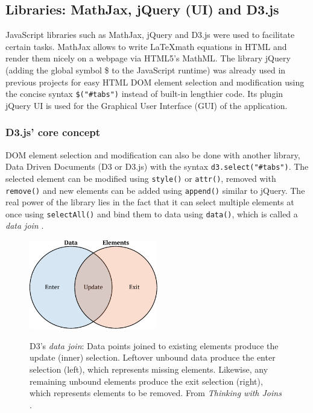 \subsection{Libraries: MathJax, jQuery (UI) and D3.js}\label{sec:libraries}
JavaScript libraries such as MathJax, jQuery and D3.js were used to facilitate certain tasks. MathJax allows to write \LaTeX math equations in HTML and render them nicely on a webpage via HTML5's MathML. The library jQuery (adding the global symbol \$ to the JavaScript runtime) was already used in previous projects for easy HTML DOM element selection and modification using the concise syntax \texttt{\$("\#tabs")} instead of built-in lengthier code. Its plugin jQuery UI is used for the Graphical User Interface (GUI) of the application.

\subsubsection{D3.js' core concept}\label{sec:dthree}
DOM element selection and modification can also be done with another library, Data Driven Documents (D3 or D3.js) \cite{bostock2011d3} with the syntax \texttt{d3.select("\#tabs")}. The selected element can be modified using \texttt{style()} or \texttt{attr()}, removed with \texttt{remove()} and new elements can be added using \texttt{append()} similar to jQuery. The real power of the library lies in the fact that it can select multiple elements at once using \texttt{selectAll()} and bind them to data using \texttt{data()}, which is called a \textit{data join} . %
\begin{figure}[htb!]
    \centering
	\includegraphics[width=0.5\textwidth]{fig/join}
	\label{fig:join}
	\caption{D3's \textit{data join}: Data points joined to existing elements produce the update (inner) selection. Leftover unbound data produce the enter selection (left), which represents missing elements. Likewise, any remaining unbound elements produce the exit selection (right), which represents elements to be removed. From \textit{Thinking with Joins} \cite{bostock2012join}.}
\end{figure}
